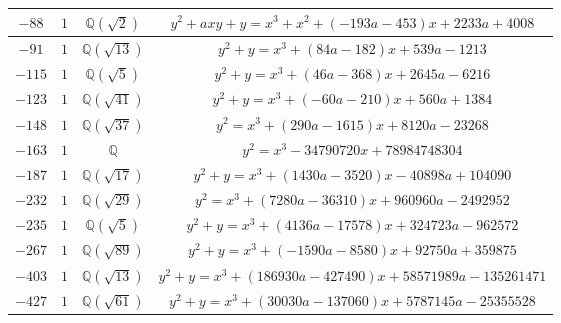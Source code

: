 \documentclass[11pt]{amsart}
\newcommand{\eclabel}[1]{\href{https://www.lmfdb.org/EllipticCurve/Q/#1}{\texttt{#1}}}
\theoremstyle{definition}
\newcommand{\Q}{\mathbb Q}
\newcommand{\QQ}{\mathbb Q}
\begin{document}
{\begin{longtable}{|c|c|c|c|}
 \hline  %
$-88$ & $1$ &   $\Q(\sqrt{2})$ &{$y^2 + axy + y = x^3 + x^2 + (-193a - 453)x + 2233a + 4008$}\\
\hline
$-91$ & $1$ &   $\Q(\sqrt{13})$ &{$y^2 + y = x^3 + (84a - 182)x + 539a - 1213$}\\
\hline
$-115$ & $1$ &   $\Q(\sqrt{5})$ &{$ y^2 + y = x^3 + (46a - 368)x + 2645a - 6216 $}\\
\hline
$-123$ & $1$ &   $\Q(\sqrt{41})$ & \href{https://www.lmfdb.org/EllipticCurve/2.2.41.1/81.1/c/1}{$y^2 + y = x^3 + (-60a - 210)x + 560a + 1384$}\\
\hline
$-148$ & $1$ &   $\Q(\sqrt{37})$ &{$y^2 = x^3 + (290a - 1615)x + 8120a - 23268$}\\
\hline
$-163$ & $1$ & $\QQ$ & \href{https://www.lmfdb.org/EllipticCurve/Q/26569/a/2}{$y^2=x^3-34790720x+78984748304$} \\ %
\hline
$-187$ & $1$ &   $\Q(\sqrt{17})$ &{$y^2 + y = x^3 + (1430a - 3520)x -40898a + 104090$}\\
\hline
$-232$ & $1$ &   $\Q(\sqrt{29})$ &{$y^2 = x^3 + (7280a - 36310)x + 960960a - 2492952$}\\
\hline
$-235$ & $1$ &   $\Q(\sqrt{5})$ &{$ y^2 + y = x^3 + (4136a - 17578)x + 324723a -962572$} \\
\hline
$-267$ & $1$ &   $\Q(\sqrt{89})$ & \href{https://www.lmfdb.org/EllipticCurve/2.2.89.1/81.1/a/1}{$y^2 + y = x^3 + (-1590a - 8580)x + 92750a + 359875$}\\
\hline
$-403$ & $1$ &   $\Q(\sqrt{13})$ &{$y^2 + y = x^3 + (186930a - 427490)x + 58571989a - 135261471$}\\
\hline
$-427$ & $1$ &   $\Q(\sqrt{61})$ &{$y^2 + y = x^3 + (30030a - 137060)x + 5787145a - 25355528$}\\
\hline
\end{longtable}
}



\newpage 
\end{document}
